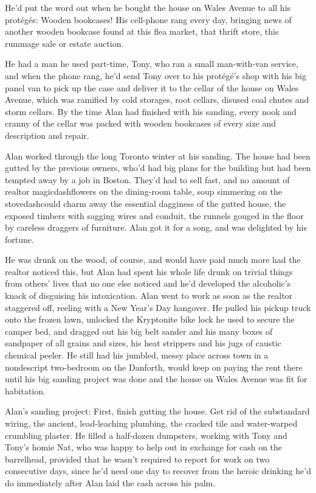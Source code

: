 He'd put the word out when he bought the house on Wales Avenue to all
his prot\'{e}g\'{e}s:  Wooden bookcases!  His cell-phone rang every day,
bringing news of another wooden bookcase found at this flea market,
that thrift store, this rummage sale or estate auction.

He had a man he used part-time, Tony, who ran a small man-with-van
service, and when the phone rang, he'd send Tony over to his
prot\'{e}g\'{e}'s shop with his big panel van to pick up the case and
deliver it to the cellar of the house on Wales Avenue, which was
ramified by cold storages, root cellars, disused coal chutes and storm
cellars.  By the time Alan had finished with his sanding, every nook
and cranny of the cellar was packed with wooden bookcases of every
size and description and repair.

Alan worked through the long Toronto winter at his sanding.  The house
had been gutted by the previous owners, who'd had big plans for the
building but had been tempted away by a job in Boston.  They'd had to
sell fast, and no amount of realtor magicdash{}flowers on the dining-room
table, soup simmering on the stovedash{}could charm away the essential
dagginess of the gutted house, the exposed timbers with sagging wires
and conduit, the runnels gouged in the floor by careless draggers of
furniture.  Alan got it for a song, and was delighted by his fortune.

He was drunk on the wood, of course, and would have paid much more had
the realtor noticed this, but Alan had spent his whole life drunk on
trivial things from others' lives that no one else noticed and he'd
developed the alcoholic's knack of disguising his intoxication.  Alan
went to work as soon as the realtor staggered off, reeling with a New
Year's Day hangover.  He pulled his pickup truck onto the frozen lawn,
unlocked the Kryptonite bike lock he used to secure the camper bed,
and dragged out his big belt sander and his many boxes of sandpaper of
all grains and sizes, his heat strippers and his jugs of caustic
chemical peeler.  He still had his jumbled, messy place across town in
a nondescript two-bedroom on the Danforth, would keep on paying the
rent there until his big sanding project was done and the house on
Wales Avenue was fit for habitation.

Alan's sanding project:  First, finish gutting the house.  Get rid of
the substandard wiring, the ancient, lead-leaching plumbing, the
cracked tile and water-warped crumbling plaster.  He filled a
half-dozen dumpsters, working with Tony and Tony's homie Nat, who was
happy to help out in exchange for cash on the barrelhead, provided
that he wasn't required to report for work on two consecutive days,
since he'd need one day to recover from the heroic drinking he'd do
immediately after Alan laid the cash across his palm.

